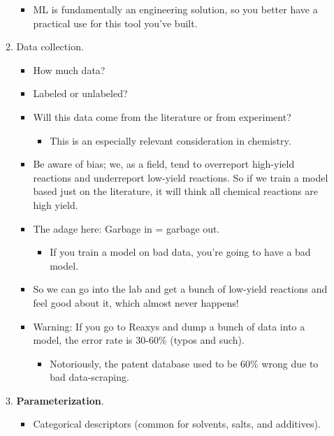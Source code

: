 \documentclass[../notes.tex]{subfiles}
\begin{document}
\begin{itemize}
\begin{enumerate}[start=0]
\begin{itemize}
\begin{itemize}
            \end{itemize}
            \item ML is fundamentally an engineering solution, so you better have a practical use for this tool you've built.
        \end{itemize}
        \item Data collection.
        \begin{itemize}
            \item How much data?
            \item Labeled or unlabeled?
            \item Will this data come from the literature or from experiment?
            \begin{itemize}
                \item This is an especially relevant consideration in chemistry.
            \end{itemize}
            \item Be aware of bias; we, as a field, tend to overreport high-yield reactions and underreport low-yield reactions. So if we train a model based just on the literature, it will think all chemical reactions are high yield.
            \item The adage here: Garbage in = garbage out.
            \begin{itemize}
                \item If you train a model on bad data, you're going to have a bad model.
            \end{itemize}
            \item So we can go into the lab and get a bunch of low-yield reactions and feel good about it, which almost never happens!
            \item Warning: If you go to Reaxys and dump a bunch of data into a model, the error rate is 30-60\% (typos and such).
            \begin{itemize}
                \item Notoriously, the patent database used to be 60\% wrong due to bad data-scraping.
            \end{itemize}
        \end{itemize}
        \item \textbf{Parameterization}.
        \begin{itemize}
            \item Categorical descriptors (common for solvents, salts, and additives).
            \begin{itemize}

\end{itemize}
\end{itemize}
\end{enumerate}
\end{itemize}
\end{document}
